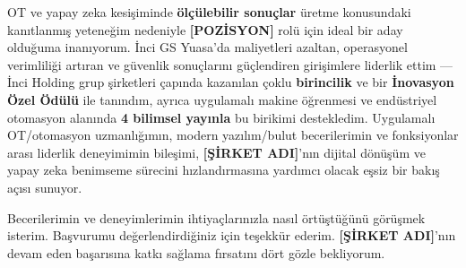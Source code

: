 \documentclass[11pt, a4paper]{awesome-cv}
\newcommand{\ph}[1]{\textcolor{awesome-red}{\bfseries #1}}
\begin{document}
\begin{cvletter}
OT ve yapay zeka kesişiminde \textbf{ölçülebilir sonuçlar} üretme konusundaki kanıtlanmış yeteneğim nedeniyle \ph{[POZİSYON]} rolü için ideal bir aday olduğuma inanıyorum. İnci GS Yuasa'da maliyetleri azaltan, operasyonel verimliliği artıran ve güvenlik sonuçlarını güçlendiren girişimlere liderlik ettim --- İnci Holding grup şirketleri çapında kazanılan çoklu \textbf{birincilik} ve bir \textbf{İnovasyon Özel Ödülü} ile tanındım, ayrıca uygulamalı makine öğrenmesi ve endüstriyel otomasyon alanında \textbf{4 bilimsel yayınla} bu birikimi destekledim. Uygulamalı OT/otomasyon uzmanlığımın, modern yazılım/bulut becerilerimin ve fonksiyonlar arası liderlik deneyimimin bileşimi, \ph{[ŞİRKET ADI]}'nın dijital dönüşüm ve yapay zeka benimseme sürecini hızlandırmasına yardımcı olacak eşsiz bir bakış açısı sunuyor.

Becerilerimin ve deneyimlerimin ihtiyaçlarınızla nasıl örtüştüğünü görüşmek isterim. Başvurumu değerlendirdiğiniz için teşekkür ederim. \ph{[ŞİRKET ADI]}'nın devam eden başarısına katkı sağlama fırsatını dört gözle bekliyorum.

\end{cvletter}

\makeletterclosing

\vspace{-8mm}

\vspace{6.8mm}

\end{document}
